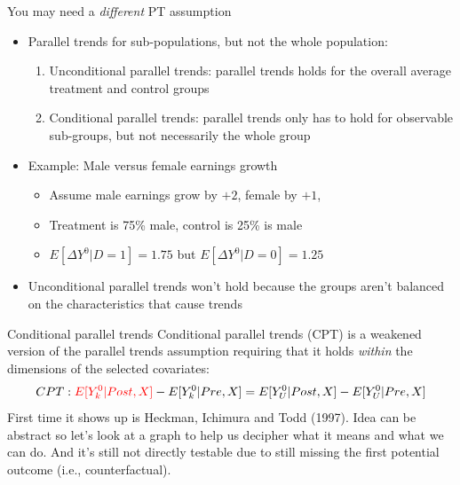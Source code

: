 \documentclass{beamer}
\begin{document}
\begin{frame}{You may need a \emph{different} PT assumption}

\begin{itemize}
\item Parallel trends for sub-populations, but not the whole population:
	\begin{enumerate}
	\item Unconditional parallel trends:  parallel trends holds for the overall average treatment and control groups
	\item Conditional parallel trends: parallel trends only has to hold for observable sub-groups, but not necessarily the whole group
	\end{enumerate}
\item Example: Male versus female earnings growth
	\begin{itemize}
	\item Assume male earnings grow by $+2$, female by $+1$, 
	\item Treatment is 75\% male, control is 25\% is male
	\item $E[\Delta Y^0|D=1]=1.75$ but $E[\Delta Y^0|D=0]=1.25$
	\end{itemize}
\item Unconditional parallel trends won't hold because the groups aren't balanced on the characteristics that cause trends 
\end{itemize}

\end{frame}



\begin{frame}{Conditional parallel trends}
Conditional parallel trends (CPT) is a weakened version of the parallel trends assumption requiring that it holds \emph{within} the dimensions of the selected covariates:
\begin{align*}
CPT: \textcolor{red}{E[Y^0_k|Post, X]} - E[Y^0_k|Pre, X] = E[Y^0_U|Post, X] - E[Y^0_U|Pre, X]
\end{align*}
First time it shows up is Heckman, Ichimura and Todd (1997). Idea can be abstract so let's look at a graph to help us decipher what it means and what we can do. And it's still not directly testable due to still missing the first potential outcome (i.e., counterfactual). 
\end{frame}
\end{document}
